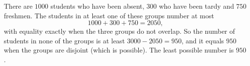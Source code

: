 There are $1000$ students who have been absent, $300$ who have been tardy and $750$ freshmen. The students in at least one of these groups number at most
\[
1000+300+750=2050,
\]
with equality exactly when the three groups do not overlap. So the number of students in none of the groups is at least $3000-2050=950$, and it equals $950$ when the groups are disjoint (which is possible). The least possible number is $\boxed{950}$.
